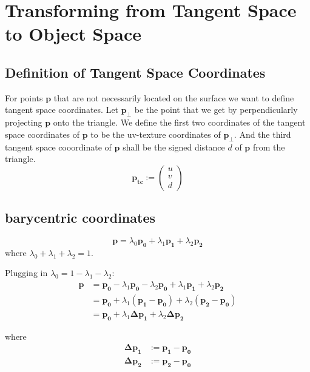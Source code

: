 \documentclass{article}
\newcommand{\point}[1]{\mathbf{#1}}
\newcommand{\colvec}[1]{\begin{pmatrix}#1\end{pmatrix}}
\begin{document}
\section{Transforming from Tangent Space to Object Space}

\subsection{Definition of Tangent Space Coordinates}
For points \(\point{p}\) that are not necessarily located on the surface we want to define tangent space coordinates. Let \(\point{p_\perp}\) be the point that we get by perpendicularly projecting \(\point{p}\) onto the triangle. We define the first two coordinates of the tangent space coordinates of \(\point{p}\) to be the uv-texture coordinates of \(\point{p_\perp}\). And the third tangent space cooordinate of \(\point{p}\) shall be the signed distance \(d\) of \(\point{p}\) from the triangle.
\begin{equation*}
 \point{p_{tc}} := \colvec{u \\ v \\ d}
\end{equation*}

\subsection{barycentric coordinates}

\[
\point{p} = \lambda_0 \point{p_0} + \lambda_1 \point{p_1} + \lambda_2 \point{p_2}
\]
where \(\lambda_0 + \lambda_1 + \lambda_2 = 1\).

Plugging in \(\lambda_0 = 1 - \lambda_1 - \lambda_2\):
\begin{align*}
\point{p} &= \point{p_0} - \lambda_1 \point{p_0} - \lambda_2 \point{p_0}  + \lambda_1 \point{p_1} + \lambda_2 \point{p_2} \\
&= \point{p_0}  + \lambda_1 (\point{p_1}-\point{p_0}) + \lambda_2 (\point{p_2} - \point{p_0})\\
&= \point{p_0} + \lambda_1 \point{\Delta p_1} + \lambda_2 \point{\Delta p_2}
\end{align*}

where
\begin{align*}
\point{\Delta p_1} &:= \point{p_1} - \point{p_0}\\
\point{\Delta p_2} &:= \point{p_2} - \point{p_0}
\end{align*}
\end{document}
